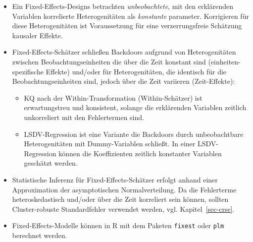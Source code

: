 \documentclass[
  a4paper,
  DIV=11,
  oneside]{scrreprt}
\begin{document}
\begin{tcolorbox}[enhanced jigsaw, breakable, colbacktitle=quarto-callout-note-color!10!white, rightrule=.15mm, title=\textcolor{quarto-callout-note-color}{\faInfo}\hspace{0.5em}{Key Facts zu Fixed-Effects-Regression}, opacityback=0, coltitle=black, colback=white, arc=.35mm, titlerule=0mm, bottomtitle=1mm, leftrule=.75mm, toptitle=1mm, bottomrule=.15mm, left=2mm, toprule=.15mm, opacitybacktitle=0.6, colframe=quarto-callout-note-color-frame]

\begin{itemize}
\item
  Ein Fixed-Effects-Designs betrachten \emph{unbeobachtete}, mit den
  erklärenden Variablen korrelierte Heterogenitäten als \emph{konstante}
  parameter. Korrigieren für diese Heterogenitäten ist Voraussetzung für
  eine verzerrungsfreie Schätzung kausaler Effekte.
\item
  Fixed-Effects-Schätzer schließen Backdoors aufgrund von
  Heterogenitäten zwischen Beobachtungseinheiten die über die Zeit
  konstant sind (einheiten-spezifische Effekte) und/oder für
  Heterogenitäten, die identisch für die Beobachtungseinheiten sind,
  jedoch über die Zeit variieren (Zeit-Effekte):

  \begin{itemize}
  \item
    KQ nach der Within-Transformation (Within-Schätzer) ist
    erwartungstreu und konsistent, solange die erklärenden Variablen
    zeitlich unkorreliert mit den Fehlertermen sind.
  \item
    LSDV-Regression ist eine Variante die Backdoors durch unbeobachtbare
    Heterogenitäten mit Dummy-Variablen schließt. In einer
    LSDV-Regression können die Koeffizienten zeitlich konstanter
    Variablen geschätzt werden.
  \end{itemize}
\item
  Statistische Inferenz für Fixed-Effects-Schätzer erfolgt anhand einer
  Approximation der asymptotischen Normalverteilung. Da die Fehlerterme
  heteroskedastisch und/oder über die Zeit korreliert sein können,
  sollten Cluster-robuste Standardfehler verwendet werden, vgl.
  Kapitel~\ref{sec-crse}.
\item
  Fixed-Effects-Modelle können in R mit dem Paketen \texttt{fixest} oder
  \texttt{plm} berechnet werden.
\end{itemize}

\end{tcolorbox}
\end{document}
